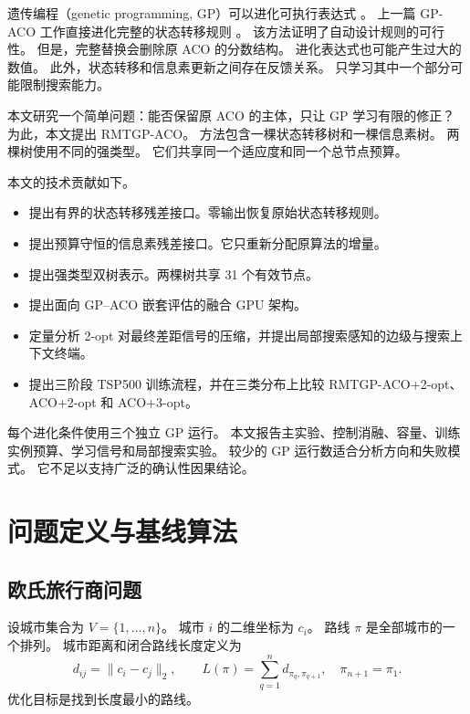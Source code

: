 \documentclass[letterpaper,journal]{IEEEtran}
\begin{document}
遗传编程（genetic programming, GP）可以进化可执行表达式
\cite{koza1992gp,poli2008fieldguide}。
上一篇 GP-ACO 工作直接进化完整的状态转移规则 \cite{lin2025gpaco}。
该方法证明了自动设计规则的可行性。
但是，完整替换会删除原 ACO 的分数结构。
进化表达式也可能产生过大的数值。
此外，状态转移和信息素更新之间存在反馈关系。
只学习其中一个部分可能限制搜索能力。

本文研究一个简单问题：能否保留原 ACO 的主体，只让 GP 学习有限的修正？
为此，本文提出 RMTGP-ACO。
方法包含一棵状态转移树和一棵信息素树。
两棵树使用不同的强类型。
它们共享同一个适应度和同一个总节点预算。

本文的技术贡献如下。
\begin{itemize}
    \item 提出有界的状态转移残差接口。零输出恢复原始状态转移规则。
    \item 提出预算守恒的信息素残差接口。它只重新分配原算法的增量。
    \item 提出强类型双树表示。两棵树共享 31 个有效节点。
    \item 提出面向 GP--ACO 嵌套评估的融合 GPU 架构。
    \item 定量分析 2-opt 对最终差距信号的压缩，并提出局部搜索感知的边级与搜索上下文终端。
    \item 提出三阶段 TSP500 训练流程，并在三类分布上比较 RMTGP-ACO+2-opt、ACO+2-opt 和 ACO+3-opt。
\end{itemize}

每个进化条件使用三个独立 GP 运行。
本文报告主实验、控制消融、容量、训练实例预算、学习信号和局部搜索实验。
较少的 GP 运行数适合分析方向和失败模式。
它不足以支持广泛的确认性因果结论。

\section{问题定义与基线算法}

\subsection{欧氏旅行商问题}

设城市集合为 \(V=\{1,\ldots,n\}\)。
城市 \(i\) 的二维坐标为 \(c_i\)。
路线 \(\pi\) 是全部城市的一个排列。
城市距离和闭合路线长度定义为
\begin{equation}
 d_{ij}=\lVert c_i-c_j\rVert_2,\qquad
 L(\pi)=\sum_{q=1}^{n}d_{\pi_q,\pi_{q+1}},
 \quad \pi_{n+1}=\pi_1 .
 \label{eq:tsp}
\end{equation}
优化目标是找到长度最小的路线。
\end{document}
